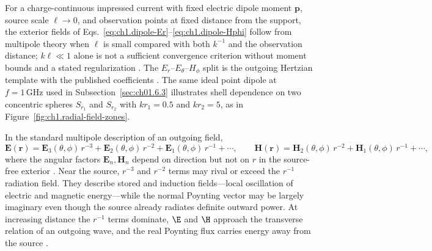 For a charge-continuous impressed current with fixed electric dipole moment $\mathbf{p}$, source scale $\ell\to 0$, and observation points at fixed distance from the support, the exterior fields of Eqs.~\eqref{eq:ch1.dipole-Er}--\eqref{eq:ch1.dipole-Hphi} follow from multipole theory when $\ell$ is small compared with both $k^{-1}$ and the observation distance; $k\ell\ll 1$ alone is not a sufficient convergence criterion without moment bounds and a stated regularization \cite{stratton1941,harrington2001,jackson1999,yaghjian1982}. The $E_r$--$E_\theta$--$H_\phi$ split is the outgoing Hertzian template with the published coefficients \cite{stratton1941,harrington2001}. The same ideal point dipole at
$f=1\,\mathrm{GHz}$ used in Subsection~\ref{sec:ch01.6.3} illustrates shell dependence on
two concentric spheres $S_{r_1}$ and $S_{r_2}$ with $kr_1=0.5$ and $kr_2=5$, as in Figure~\ref{fig:ch1.radial-field-zones}.

In the standard multipole description of an outgoing field,
\begin{equation}
\label{eq:ch1.ex64-multipole-radial}
\mathbf{E}(\mathbf{r})=\mathbf{E}_3(\theta,\phi)\,r^{-3}+\mathbf{E}_2(\theta,\phi)\,r^{-2}+\mathbf{E}_1(\theta,\phi)\,r^{-1}+\cdots,
\qquad
\mathbf{H}(\mathbf{r})=\mathbf{H}_2(\theta,\phi)\,r^{-2}+\mathbf{H}_1(\theta,\phi)\,r^{-1}+\cdots,
\end{equation}
where the angular factors $\mathbf{E}_n,\mathbf{H}_n$ depend on direction but not on $r$ in the source-free exterior \cite{stratton1941}. Near the source, $r^{-3}$ and $r^{-2}$ terms may rival or exceed the $r^{-1}$ radiation field. They describe stored and induction fields—local oscillation of electric and magnetic energy—while the normal Poynting vector may be largely imaginary even though the source already radiates definite outward power. At increasing distance the $r^{-1}$ terms dominate, $\E$ and $\H$ approach the transverse relation of an outgoing wave, and the real Poynting flux carries energy away from the source \cite{poynting1884}.

